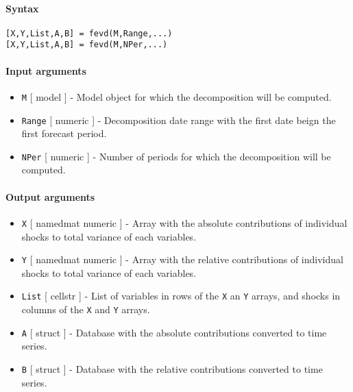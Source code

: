 


	\paragraph{Syntax}

\begin{verbatim}
[X,Y,List,A,B] = fevd(M,Range,...)
[X,Y,List,A,B] = fevd(M,NPer,...)
\end{verbatim}

\paragraph{Input arguments}

\begin{itemize}
\item
  \texttt{M} {[} model {]} - Model object for which the decomposition
  will be computed.
\item
  \texttt{Range} {[} numeric {]} - Decomposition date range with the
  first date beign the first forecast period.
\item
  \texttt{NPer} {[} numeric {]} - Number of periods for which the
  decomposition will be computed.
\end{itemize}

\paragraph{Output arguments}

\begin{itemize}
\item
  \texttt{X} {[} namedmat \textbar{} numeric {]} - Array with the
  absolute contributions of individual shocks to total variance of each
  variables.
\item
  \texttt{Y} {[} namedmat \textbar{} numeric {]} - Array with the
  relative contributions of individual shocks to total variance of each
  variables.
\item
  \texttt{List} {[} cellstr {]} - List of variables in rows of the
  \texttt{X} an \texttt{Y} arrays, and shocks in columns of the
  \texttt{X} and \texttt{Y} arrays.
\item
  \texttt{A} {[} struct {]} - Database with the absolute contributions
  converted to time series.
\item
  \texttt{B} {[} struct {]} - Database with the relative contributions
  converted to time series.
\end{itemize}


